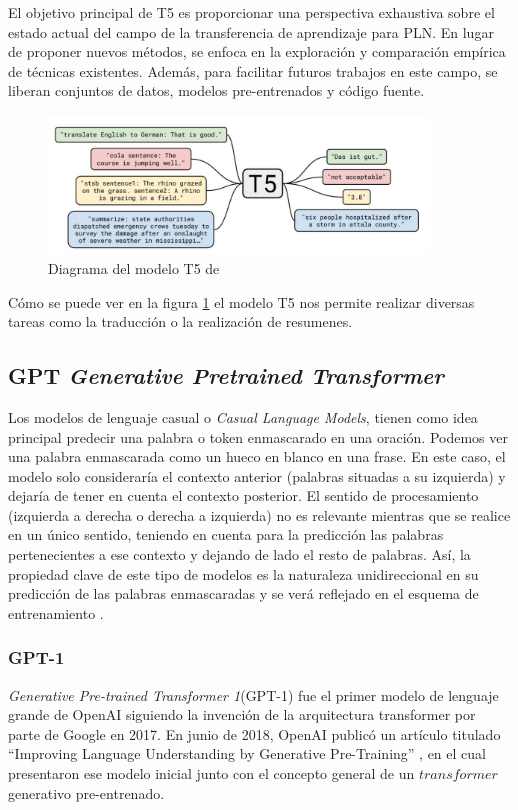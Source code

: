 El objetivo principal de T5 es proporcionar una perspectiva exhaustiva sobre el estado actual del campo de la transferencia de aprendizaje para PLN. En lugar de proponer nuevos métodos, se enfoca en la exploración y comparación empírica de técnicas existentes. Además, para facilitar futuros trabajos en este campo, se liberan conjuntos de datos, modelos pre-entrenados y código fuente.

\begin{figure}[h]
	\centering
	\includegraphics[width=0.9\textwidth]{Imagenes/T5}
	\caption{Diagrama del modelo T5 de \cite{T5}}
	\label{fig:3.2}
\end{figure}

Cómo se puede ver en la figura \ref{fig:3.2} el modelo T5 nos permite realizar diversas tareas como la traducción o la realización de resumenes.

\subsection{GPT \textit{Generative Pretrained Transformer}}

Los modelos de lenguaje casual o \textit{Casual Language Models}, tienen como idea principal predecir una palabra o token enmascarado en una oración. Podemos ver una palabra enmascarada como un hueco en blanco en una frase. En este caso, el modelo solo consideraría el contexto anterior (palabras situadas a su izquierda) y dejaría de tener en cuenta el contexto posterior. El sentido de procesamiento (izquierda a derecha o derecha a izquierda) no es relevante mientras que se realice en un único sentido, teniendo en cuenta para la predicción las palabras pertenecientes a ese contexto y dejando de lado el resto de palabras. Así, la propiedad clave de este tipo de modelos es la naturaleza unidireccional en su predicción de las palabras enmascaradas y se verá reflejado en el esquema de entrenamiento \citep{rothman2022}.

\subsubsection{GPT-1}
\textit{Generative Pre-trained Transformer 1}(GPT-1) fue el primer modelo de lenguaje grande de OpenAI siguiendo la invención de la arquitectura transformer por parte de Google en 2017. En junio de 2018, OpenAI publicó un artículo titulado ``Improving Language Understanding by Generative Pre-Training'' \cite{radford2018improving}, en el cual presentaron ese modelo inicial junto con el concepto general de un $transformer$ generativo pre-entrenado.

